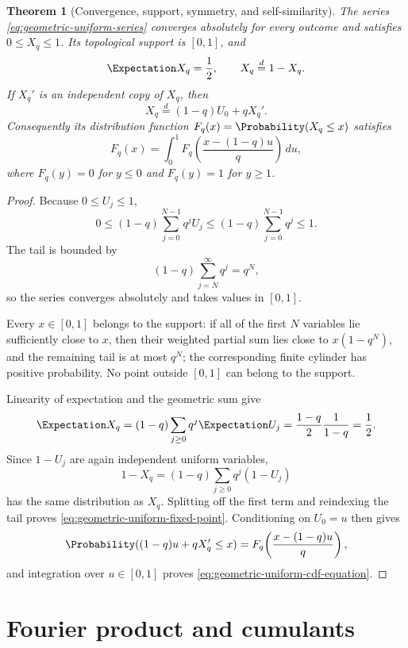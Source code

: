 \documentclass[11pt,a4paper,oneside,openany]{book}
\newtheorem{theorem}{Theorem}[chapter]
\theoremstyle{definition}
\theoremstyle{remark}
\begin{document}
\begin{theorem}[Convergence, support, symmetry, and self-similarity]\label{thm:geometric-uniform-basic}
The series \eqref{eq:geometric-uniform-series} converges absolutely for every outcome and satisfies $0\le X_q\le1$.  Its topological support is $[0,1]$, and
\begin{equation}\label{eq:geometric-uniform-mean-symmetry}
 \Expectation X_q=\frac12,
 \qquad
 X_q\overset{d}=1-X_q.
\end{equation}
If $X_q'$ is an independent copy of $X_q$, then
\begin{equation}\label{eq:geometric-uniform-fixed-point}
 X_q\overset{d}=(1-q)U_0+qX_q'.
\end{equation}
Consequently its distribution function $F_q(x)=\Probability(X_q\le x)$ satisfies
\begin{equation}\label{eq:geometric-uniform-cdf-equation}
 F_q(x)=\int_0^1
 F_q\!\left(\frac{x-(1-q)u}{q}\right)\,du,
\end{equation}
where $F_q(y)=0$ for $y\le0$ and $F_q(y)=1$ for $y\ge1$.
\end{theorem}

\begin{proof}
Because $0\le U_j\le1$,
\[
 0\le (1-q)\sum_{j=0}^{N-1}q^jU_j
 \le(1-q)\sum_{j=0}^{N-1}q^j\le1.
\]
The tail is bounded by
\[
 (1-q)\sum_{j=N}^{\infty}q^j=q^N,
\]
so the series converges absolutely and takes values in $[0,1]$.

Every $x\in[0,1]$ belongs to the support: if all of the first $N$ variables lie sufficiently close to $x$, then their weighted partial sum lies close to $x(1-q^N)$, and the remaining tail is at most $q^N$; the corresponding finite cylinder has positive probability.  No point outside $[0,1]$ can belong to the support.

Linearity of expectation and the geometric sum give
\[
 \Expectation X_q=(1-q)\sum_{j\ge0}q^j\Expectation U_j
 =\frac{1-q}{2}\frac1{1-q}=\frac12.
\]
Since $1-U_j$ are again independent uniform variables,
\[
 1-X_q=(1-q)\sum_{j\ge0}q^j(1-U_j)
\]
has the same distribution as $X_q$.  Splitting off the first term and reindexing the tail proves \eqref{eq:geometric-uniform-fixed-point}.  Conditioning on $U_0=u$ then gives
\[
 \Probability((1-q)u+qX_q'\le x)
 =F_q\!\left(\frac{x-(1-q)u}{q}\right),
\]
and integration over $u\in[0,1]$ proves \eqref{eq:geometric-uniform-cdf-equation}.
\end{proof}

\section{Fourier product and cumulants}
\end{document}
